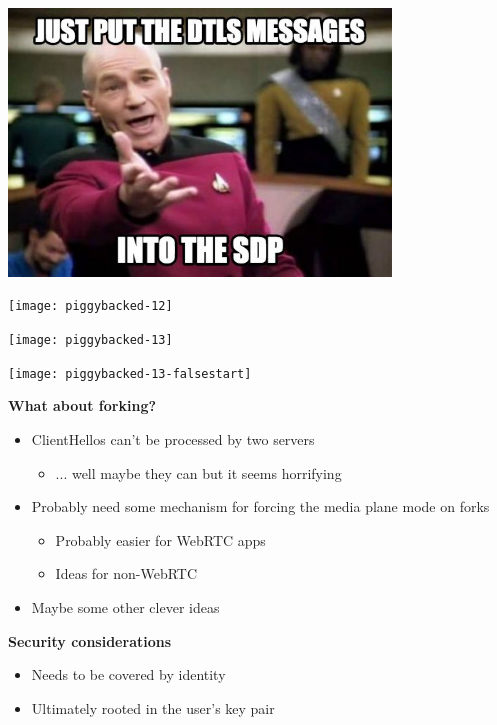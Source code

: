 \documentclass[helvetica]{seminar}
\newcommand{\heading}[1]{%
  \begin{center} 
    \large\bf 
    #1 
  \end{center} 
  \vspace{.4 in}}
\begin{document}
\begin{slide}
\includegraphics[width=4in]{850871}
\end{slide}


\begin{slide}
\texttt{[image: piggybacked-12]}
\end{slide}

\begin{slide}
\texttt{[image: piggybacked-13]}
\end{slide}

\begin{slide}
\texttt{[image: piggybacked-13-falsestart]}
\end{slide}


\begin{slide}
\heading{What about forking?}

\begin{itemize}
\item ClientHellos can't be processed by two servers
  \begin{itemize}
  \item ... well maybe they can but it seems horrifying
  \end{itemize}
\item Probably need some mechanism for forcing the media plane mode on forks
  \begin{itemize}
  \item Probably easier for WebRTC apps
  \item Ideas for non-WebRTC
  \end{itemize}
\item Maybe some other clever ideas
\end{itemize}
\end{slide}


\begin{slide}
\heading{Security considerations}

\begin{itemize}
\item Needs to be covered by identity
\item Ultimately rooted in the user's key pair
\end{itemize}

\end{slide}
\end{document}
